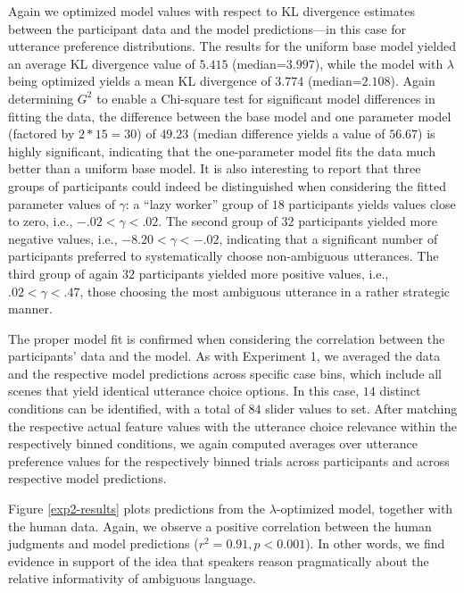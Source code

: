 \documentclass[10pt,a4paper]{article}
\begin{document}
Again we optimized model values with respect to KL divergence estimates between the participant data and the model predictions---in this case for utterance preference distributions. 
The results for the uniform base model yielded an average KL divergence value of $5.415$ (median=$3.997$), while the model with $\lambda$ being optimized yields a mean KL divergence of $3.774$ (median=$2.108$).
Again determining $G^2$ to enable a Chi-square test for significant model differences in fitting the data, the difference between the base model and one parameter model (factored by $2*15=30$) of $49.23$ (median difference yields a value of $56.67$) is highly significant, indicating that the one-parameter model fits the data much better than a uniform base model. 
It is also interesting to report that three groups of participants could indeed be distinguished when considering the fitted parameter values of $\gamma$: 
a ``lazy worker'' group of $18$ participants yields values close to zero, i.e.,  $-.02 < \gamma<.02$.
The second group of $32$ participants yielded more negative values, i.e., $-8.20<\gamma<-.02$, indicating that a significant number of participants preferred to systematically choose non-ambiguous utterances. 
The third group of again $32$ participants yielded more positive values, i.e., $.02<\gamma<.47$, those choosing the most ambiguous utterance in a rather strategic manner. 


The proper model fit is confirmed when considering the correlation between the participants' data and the model.
As with Experiment 1, we averaged the data and the respective model predictions across specific case bins, which include all scenes that yield identical utterance choice options. 
In this case, $14$ distinct conditions can be identified, with a total of $84$ slider values to set. 
After matching the respective actual feature values with the utterance choice relevance within the respectively binned conditions, we again computed averages over utterance preference values for the respectively binned trials across participants and across respective model predictions. 


Figure \ref{exp2-results} plots predictions from the $\lambda$-optimized model, together with the human data. Again, we observe a positive correlation between the human judgments and model predictions ($r^2 = 0.91, p < 0.001$). In other words, we find evidence in support of the idea that speakers reason pragmatically about the relative informativity of ambiguous language.
\end{document}
